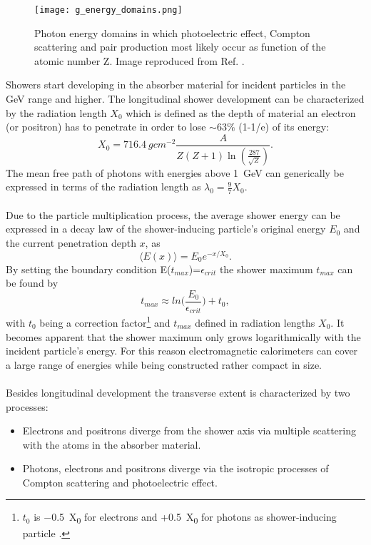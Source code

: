 \documentclass[../../main.tex]{subfiles}
\begin{document}
\begin{figure}[htp]
			\begin{center}
				\texttt{[image: g\_energy\_domains.png]}
				\caption{Photon energy domains in which photoelectric effect, Compton scattering and pair production most likely occur as function of the atomic number Z. Image reproduced from Ref. \cite{wigmans08}.}
				\label{fig:g_e_dom}
			\end{center}
\end{figure}
Showers start developing in the absorber material for incident particles in the GeV range and higher. The longitudinal shower development can be characterized by the radiation length $X_0$ which is defined as the depth of material an electron (or positron) has to penetrate in order to lose $\sim63\%$ (1-1/e) of its energy:
\begin{equation}
	X_0 = \SI{716.4}{gcm^{-2}} \frac{A}{Z(Z+1)\ln(\frac{287}{\sqrt{Z}})}.
\end{equation}
The mean free path of photons with energies above \SI{1}{GeV} can generically be expressed in terms of the radiation length as $\lambda_0 = \frac{9}{7}X_0$.\\
\\
Due to the particle multiplication process, the average shower energy can be expressed in a decay law of the shower-inducing particle's original energy $E_0$ and the current penetration depth $x$, as
\begin{equation}
	\langle E(x)\rangle = E_0e^{-x/X_0}.
	\label{eq:E}
\end{equation}
By setting the boundary condition E($t_{max}$)=$\epsilon_{crit}$ the shower maximum $t_{max}$ can be found by
\begin{equation}
	t_{max} \approx ln\bigg(\frac{E_0}{\epsilon_{crit}}\bigg)+t_0,
\end{equation}
with $t_0$ being a correction factor\footnote{$t_0$ is \SI{-0.5}{X_0} for electrons and +\SI{0.5}{X_0} for photons as shower-inducing particle \cite{calo03}.} and $t_{max}$ defined in radiation lengths $X_0$. It becomes apparent that the shower maximum only grows logarithmically with the incident particle's energy. For this reason electromagnetic calorimeters can cover a large range of energies while being constructed rather compact in size.\\
\\
Besides longitudinal development the transverse extent is characterized by two processes:
\begin{itemize}
	\item Electrons and positrons diverge from the shower axis via multiple scattering with the atoms in the absorber material.
	\item Photons, electrons and positrons diverge via the isotropic processes of Compton scattering and photoelectric effect.
\end{itemize}
\end{document}
